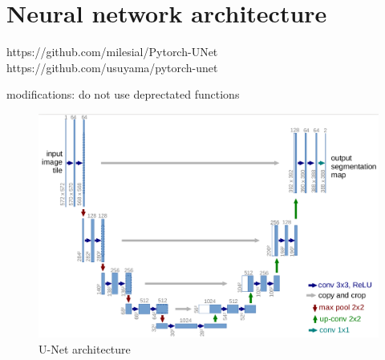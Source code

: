 \section{Neural network architecture}
https://github.com/milesial/Pytorch-UNet
https://github.com/usuyama/pytorch-unet

modifications: do not use deprectated functions

\begin{figure}[H]
\centering
\caption{U-Net architecture}
\includegraphics[width=14cm]{images/unet.png}
\end{figure}
